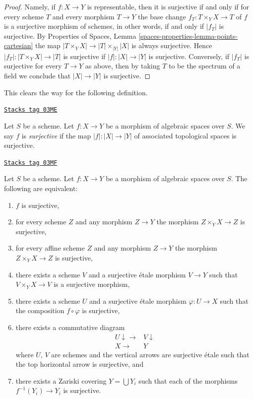 \begin{proof}
Namely, if $f : X \to Y$ is representable, then it is surjective if and only if
for every scheme $T$ and every morphism $T \to Y$ the base change
$f_T : T \times_Y X \to T$ of $f$ is a surjective morphism of schemes,
in other words, if and only if $|f_T|$ is surjective. By
Properties of Spaces, Lemma \ref{spaces-properties-lemma-points-cartesian}
the map $|T \times_Y X| \to |T| \times_{|Y|} |X|$ is always surjective.
Hence $|f_T| : |T \times_Y X| \to |T|$ is surjective if $|f| : |X| \to |Y|$
is surjective. Conversely, if $|f_T|$ is surjective
for every $T \to Y$ as above, then by taking $T$ to be the spectrum of a
field we conclude that $|X| \to |Y|$ is surjective.
\end{proof}

This clears the way for the following definition.

\begin{definition}[Surjective]
\label{spaces-morphisms-definition-surjective}
\href{https://stacks.math.columbia.edu/tag/03ME}{\texttt{Stacks tag 03ME}}

Let $S$ be a scheme. Let $f : X \to Y$ be a morphism of algebraic
spaces over $S$. We say $f$ is {\it surjective}
if the map $|f| : |X| \to |Y|$ of associated topological spaces
is surjective.
\end{definition}

\begin{lemma}
\label{spaces-morphisms-lemma-surjective-local}
\href{https://stacks.math.columbia.edu/tag/03MF}{\texttt{Stacks tag 03MF}}

Let $S$ be a scheme.
Let $f : X \to Y$ be a morphism of algebraic spaces over $S$.
The following are equivalent:
\begin{enumerate}
\item $f$ is surjective,
\item for every scheme $Z$ and any morphism $Z \to Y$ the morphism
$Z \times_Y X \to Z$ is surjective,
\item for every affine scheme $Z$ and any morphism
$Z \to Y$ the morphism $Z \times_Y X \to Z$ is surjective,
\item there exists a scheme $V$ and a surjective \'etale morphism
$V \to Y$ such that $V \times_Y X \to V$ is a surjective morphism,
\item there exists a scheme $U$ and a surjective \'etale morphism
$\varphi : U \to X$ such that the composition $f \circ \varphi$
is surjective,
\item there exists a commutative diagram
$$
\begin{array}{cc}U \downarrow\longrightarrow & V \downarrow \\ X \longrightarrow & Y\end{array}
$$
where $U$, $V$ are schemes and the vertical arrows are surjective \'etale
such that the top horizontal arrow is surjective, and
\item there exists a Zariski covering $Y = \bigcup Y_i$ such that
each of the morphisms $f^{-1}(Y_i) \to Y_i$ is surjective.
\end{enumerate}
\end{lemma}

